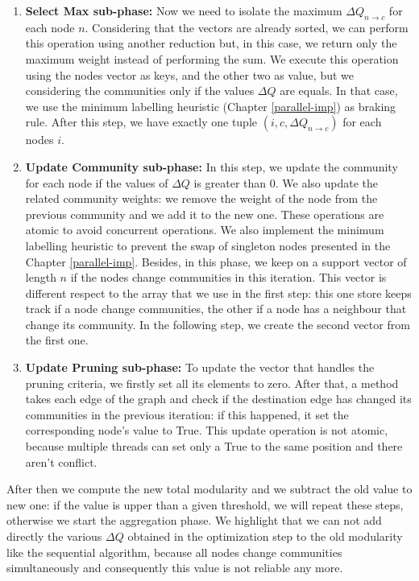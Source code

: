 \begin{enumerate}
	\item \textbf{Select Max sub-phase:} Now we need to isolate the maximum $\Delta Q_{n\rightarrow c}$ for each node $n$. Considering that the vectors are already sorted, we can perform this operation using another reduction but, in this case, we return only the maximum weight instead of performing the sum. We execute this operation using the nodes vector as keys, and the other two as value, but we considering the communities only if the values $\Delta Q$ are equals. In that case, we use the minimum labelling heuristic (Chapter \ref{parallel-imp}) as braking rule.  After this step, we have exactly one tuple  $(i, c, \Delta Q_{n\rightarrow c})$  for each nodes $i$.
	\item \textbf{Update Community sub-phase:}\label{update_com} In this step, we update the community for each node if the values of $\Delta Q$ is greater than 0. We also update the related community weights: we remove the weight of the node from the previous community and we add it to the new one. These operations are atomic to avoid concurrent operations. We also implement the minimum labelling heuristic to prevent the swap of singleton nodes presented in the Chapter \ref{parallel-imp}. Besides, in this phase, we keep on a support vector of length $n$ if the nodes change communities in this iteration. This vector is different respect to the array that we use in the first step: this one store keeps track if a node change communities, the other if a node has a neighbour that change its community. In the following step, we create the second vector from the first one.
	\item \textbf{Update Pruning sub-phase:}\label{update_prun}  To update the vector that handles the pruning criteria, we firstly set all its elements to zero. After that, a method takes each edge of the graph and check if the destination edge has changed its communities in the previous iteration: if this happened, it set the corresponding node's value to True. This update operation is not atomic, because multiple threads can set only a True to the same position and there aren't conflict.
\end{enumerate}
After then we compute the new total modularity and we subtract the old value to new one: if the value is upper than a given threshold, we will repeat these steps, otherwise we start the aggregation phase. We highlight that we can not add directly the various $\Delta Q$ obtained in the optimization step to the old modularity
like the sequential algorithm, because all nodes change communities simultaneously and consequently this value is not reliable any more.\\
